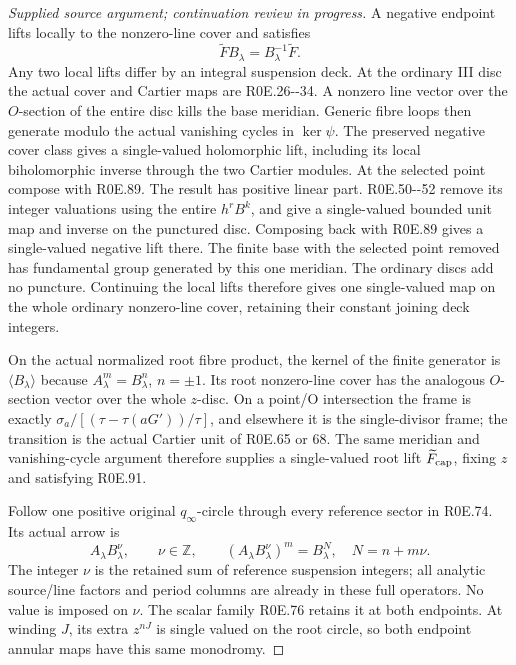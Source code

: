 \begin{proof}[Supplied source argument; continuation review in progress]
A negative endpoint lifts locally to the nonzero-line cover and
satisfies
\[
                        \widetilde F B_\lambda
                              =B_\lambda^{-1}\widetilde F.
 \tag{R0E.91}
\]
Any two local lifts differ by an integral suspension deck. At the
ordinary III disc the actual cover and Cartier maps are R0E.26-\/-34.
A nonzero line vector over the \(O\)-section of the entire disc
kills the base meridian. Generic fibre loops then generate modulo
the actual vanishing cycles in \(\ker\psi\). The preserved
negative cover class gives a single-valued holomorphic lift,
including its local biholomorphic inverse through the two
Cartier modules. At the selected point compose with R0E.89.
The result has positive linear part. R0E.50-\/-52 remove its
integer valuations using the entire \(h^rB^k\), and give a
single-valued bounded unit map and inverse on the punctured disc.
Composing back with R0E.89 gives a single-valued negative lift
there. The finite base with the selected point removed has
fundamental group generated by this one meridian. The ordinary
discs add no puncture. Continuing the local lifts therefore
gives one single-valued map on the whole ordinary nonzero-line
cover, retaining their constant joining deck integers.

On the actual normalized root fibre product, the kernel of the
finite generator is \(\langle B_\lambda\rangle\) because
\(A_\lambda^m=B_\lambda^n\), \(n=\pm1\). Its root nonzero-line
cover has the analogous \(O\)-section vector over the whole
\(z\)-disc. On a point/O intersection the frame is exactly
\(\sigma_a/[(\tau-\tau(aG'))/\tau]\), and elsewhere it is the
single-divisor frame; the transition is the actual Cartier unit
of R0E.65 or 68. The same meridian and vanishing-cycle argument
therefore supplies a single-valued root lift
\(\widetilde F_{\rm cap}\), fixing \(z\) and satisfying R0E.91.

Follow one positive original \(q_\infty\)-circle through every
reference sector in R0E.74. Its actual arrow is
\[
 A_\lambda B_\lambda^\nu,\qquad \nu\in\mathbb Z,\qquad
 (A_\lambda B_\lambda^\nu)^m=B_\lambda^N,\quad N=n+m\nu.
 \tag{R0E.92}
\]
The integer \(\nu\) is the retained sum of reference suspension
integers; all analytic source/line factors and period columns
are already in these full operators. No value is imposed on
\(\nu\). The scalar family R0E.76 retains it at both endpoints.
At winding \(J\), its extra \(z^{nJ}\) is single valued on the
root circle, so both endpoint annular maps have this same
monodromy.


\end{proof}
